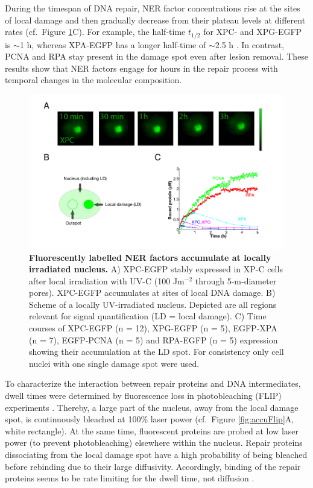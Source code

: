 During the timespan of DNA repair, NER factor concentrations rise at the sites of local damage and then gradually decrease from their plateau levels at different rates (cf.\ Figure \ref{fig:accuImage}C). For example, the half-time $t_\text{1/2}$ for XPC- and XPG-EGFP is $\sim$1 h, whereas XPA-EGFP has a longer half-time of $\sim$2.5 h \cite{Luijsterburg2010}. In contrast, PCNA and RPA stay present in the damage spot even after lesion removal. These results show that NER factors engage for hours in the repair process with temporal changes in the molecular composition.\\
\begin{figure}[t!]
	\begin{center}
		\includegraphics[width=1\textwidth]{Abbildungen/figure2_2.pdf}
		\caption{\textbf{Fluorescently labelled NER factors accumulate at locally irradiated nucleus.} A) XPC-EGFP  stably expressed in XP-C cells  after local irradiation with UV-C (100 J$\text{m}^{-\text{2}}$ through 5-\textmu m-diameter pores). XPC-EGFP accumulates at sites of local DNA damage.  B) Scheme of a locally UV-irradiated nucleus. Depicted are all regions relevant for signal quantification (LD = local damage). C) Time courses of XPC-EGFP (n = 12), XPG-EGFP (n = 5), EGFP-XPA (n = 7), EGFP-PCNA (n = 5) and RPA-EGFP (n = 5) expression showing their accumulation at the LD spot. For consistency only cell nuclei with one single damage spot were used.}
		\label{fig:accuImage}
	\end{center}
\end{figure}
To characterize the interaction between repair proteins and DNA intermediates, dwell times were determined by fluorescence loss in photobleaching (FLIP) experiments \cite{Luijsterburg2010}. Thereby, a large part of the nucleus, away from the local damage spot, is continuously bleached at 100\% laser power (cf.\ Figure \ref{fig:accuFlip}A, white rectangle). At the same time, fluorescent proteins are probed at low laser power (to prevent photobleaching) elsewhere within the nucleus. Repair proteins dissociating from the local damage spot have a high probability of being bleached before rebinding due to their large diffusivity. Accordingly, binding of the repair proteins seems to be rate limiting for the dwell time, not diffusion \cite{Luijsterburg2010}.\\
